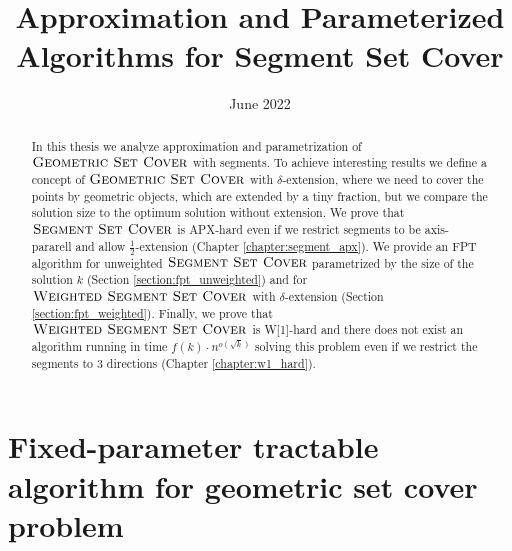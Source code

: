 \documentclass[en]{pracamgr}
\title{Approximation and Parameterized Algorithms for Segment Set Cover}
\date{June 2022}
\theoremstyle{plain}
\theoremstyle{definition}
\begin{document}
\maketitle

\newcommand{\SetCover}{\textsc{Set Cover}}
\newcommand{\GeometricSetCover}{\textsc{Geometric Set Cover}}
\newcommand{\SegmentSetCover}{\textsc{Segment Set Cover}}
\newcommand{\WeightedSegmentSetCover}{\textsc{Weighted Segment Set Cover}}
\newcommand{\WeightedGeometricSetCover}{\textsc{Weighted Geometric Set Cover}}

\begin{abstract}
	In this thesis we analyze approximation
	and parametrization of $\GeometricSetCover$ with segments.
	To achieve interesting results we define a concept
	of $\GeometricSetCover$ with $\delta$-extension, where we
	need to cover the points by geometric objects,
	which are extended by a tiny fraction,
	but we compare the solution size to the optimum solution without extension.
	We prove that $\SegmentSetCover$ is APX-hard
	even if we restrict segments to be axis-pararell
	and allow $\frac{1}{2}$-extension (Chapter \ref{chapter:segment_apx}).
	We provide an FPT algorithm for unweighted $\SegmentSetCover$
	parametrized by the size of the solution $k$
	(Section \ref{section:fpt_unweighted})
	and for $\WeightedSegmentSetCover$ with $\delta$-extension
	(Section \ref{section:fpt_weighted}).
	Finally, we prove that $\WeightedSegmentSetCover$
	is W[1]-hard and there does not exist an algorithm running
	in time $f(k)\cdot n^{o(\sqrt{k})}$ solving this problem
	even if we restrict the segments to 3 directions
	(Chapter \ref{chapter:w1_hard}).
\end{abstract}

\tableofcontents



\chapter{Fixed-parameter tractable algorithm for geometric set cover problem}






\end{document}
